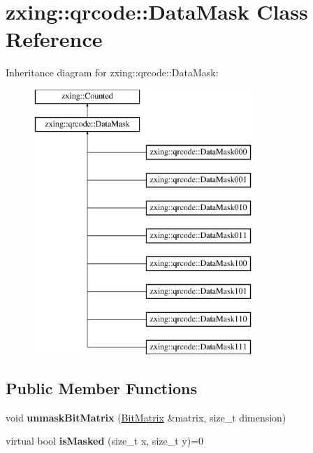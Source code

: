 \hypertarget{classzxing_1_1qrcode_1_1_data_mask}{}\section{zxing\+:\+:qrcode\+:\+:Data\+Mask Class Reference}
\label{classzxing_1_1qrcode_1_1_data_mask}
Inheritance diagram for zxing\+:\+:qrcode\+:\+:Data\+Mask\+:\begin{figure}[H]
\begin{center}
\leavevmode
\includegraphics[height=10.000000cm]{classzxing_1_1qrcode_1_1_data_mask}
\end{center}
\end{figure}
\subsection*{Public Member Functions}
\begin{DoxyCompactItemize}
\item 
\mbox{\label{classzxing_1_1qrcode_1_1_data_mask_a2fd74e31f86fe1f9b4d2ee546ffb7705}} 
void {\bfseries unmask\+Bit\+Matrix} (\mbox{\hyperlink{classzxing_1_1_bit_matrix}{Bit\+Matrix}} \&matrix, size\+\_\+t dimension)
\item 
\mbox{\label{classzxing_1_1qrcode_1_1_data_mask_a3606f602e95c1ad979b7e762674fd503}} 
virtual bool {\bfseries is\+Masked} (size\+\_\+t x, size\+\_\+t y)=0
\end{DoxyCompactItemize}
